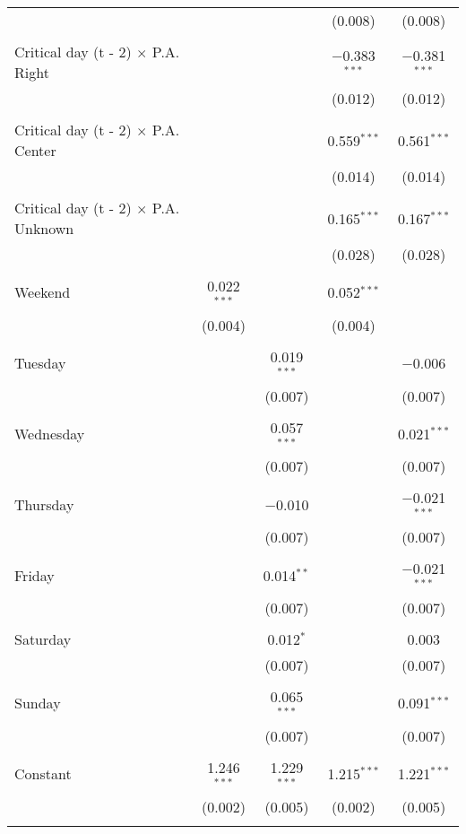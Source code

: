 \documentclass[
]{article}
\begin{document}
\begin{table}[!htbp]
{\begin{tabular}{@{\extracolsep{5pt}}lcccc}
  &  &  & (0.008) & (0.008) \\ 
  & & & & \\ 
 Critical day (t - 2) $\times$ P.A. Right &  &  & $-$0.383$^{***}$ & $-$0.381$^{***}$ \\ 
  &  &  & (0.012) & (0.012) \\ 
  & & & & \\ 
 Critical day (t - 2) $\times$ P.A. Center &  &  & 0.559$^{***}$ & 0.561$^{***}$ \\ 
  &  &  & (0.014) & (0.014) \\ 
  & & & & \\ 
 Critical day (t - 2) $\times$ P.A. Unknown &  &  & 0.165$^{***}$ & 0.167$^{***}$ \\ 
  &  &  & (0.028) & (0.028) \\ 
  & & & & \\ 
 Weekend & 0.022$^{***}$ &  & 0.052$^{***}$ &  \\ 
  & (0.004) &  & (0.004) &  \\ 
  & & & & \\ 
 Tuesday &  & 0.019$^{***}$ &  & $-$0.006 \\ 
  &  & (0.007) &  & (0.007) \\ 
  & & & & \\ 
 Wednesday &  & 0.057$^{***}$ &  & 0.021$^{***}$ \\ 
  &  & (0.007) &  & (0.007) \\ 
  & & & & \\ 
 Thursday &  & $-$0.010 &  & $-$0.021$^{***}$ \\ 
  &  & (0.007) &  & (0.007) \\ 
  & & & & \\ 
 Friday &  & 0.014$^{**}$ &  & $-$0.021$^{***}$ \\ 
  &  & (0.007) &  & (0.007) \\ 
  & & & & \\ 
 Saturday &  & 0.012$^{*}$ &  & 0.003 \\ 
  &  & (0.007) &  & (0.007) \\ 
  & & & & \\ 
 Sunday &  & 0.065$^{***}$ &  & 0.091$^{***}$ \\ 
  &  & (0.007) &  & (0.007) \\ 
  & & & & \\ 
 Constant & 1.246$^{***}$ & 1.229$^{***}$ & 1.215$^{***}$ & 1.221$^{***}$ \\ 
  & (0.002) & (0.005) & (0.002) & (0.005) \\ 
  & & & & \\ 

\end{tabular}}
\end{table}
\end{document}
